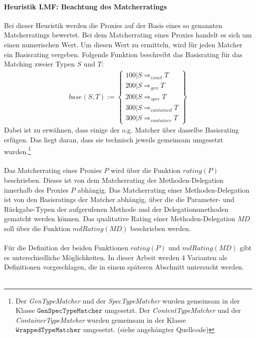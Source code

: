 \documentclass[a4paper,12pt]{article}
\begin{document}
\paragraph{Heuristik LMF: Beachtung des Matcherratings}
\noindent
\newline
Bei dieser Heuristik werden die Proxies auf der Basis eines so genannten Matcherratings bewertet. Bei dem Matcherrating eines Proxies handelt es sich um einen numerischen Wert. Um diesen Wert zu ermitteln, wird für jeden Matcher ein Basisrating vergeben. Folgende Funktion beschreibt das Basisrating für das Matching zweier Typen $S$ und $T$:
\begin{gather*}
\mathit{base(S,T)} :=  \left\{ 
				\begin{array}{l}
					100 | S \Rightarrow_{exact}  T  \\
					200 | S \Rightarrow_{gen}  T  \\
					200 | S \Rightarrow_{spec}  T  \\
					300 | S \Rightarrow_{contained}  T   \\
					300 | S \Rightarrow_{container}  T  				
				\end{array}             
	\right\}
\end{gather*}
\noindent
Dabei ist zu erwähnen, dass einige der o.g. Matcher über dasselbe Basisrating erfügen. Das liegt daran, dass sie technisch jeweils gemeinsam umgesetzt wurden.\footnote{Der \emph{GenTypeMatcher} und der \emph{SpecTypeMatcher} wurden gemeinsam in der Klasse $\texttt{GenSpecTypeMatcher}$ umgesetzt. Der \emph{ContentTypeMatcher} und der \emph{ContainerTypeMatcher} wurden gemeinsam in der Klasse $\texttt{WrappedTypeMatcher}$ umgesetzt. (siehe angehängter Quellcode)}\\\\
Das Matcherrating eines Proxies $P$ wird über die Funktion $\mathit{rating(P)}$ beschrieben. Dieses ist von dem Matcherrating der Methoden-Delegation innerhalb des Proxies $P$ abhängig. Das Matcherrating einer Methoden-Delegation ist von den Basisratings der Matcher abhängig, über die die Parameter- und Rückgabe-Typen der aufgerufenen Methode und der Delegationsmethoden gematcht werden können. Das qualitative Rating einer Methoden-Delegation $\mathit{MD}$ soll über die Funktion $\mathit{mdRating(MD)}$ beschrieben werden.\\\\
Für die Definition der beiden Funktionen $\mathit{rating(P)}$ und $\mathit{mdRating(MD)}$ gibt es unterschiedliche Möglichkeiten. In dieser Arbeit werden 4 Varianten als Definitionen vorgeschlagen, die in einem späteren Abschnitt untersucht werden.\\\\
\end{document}

